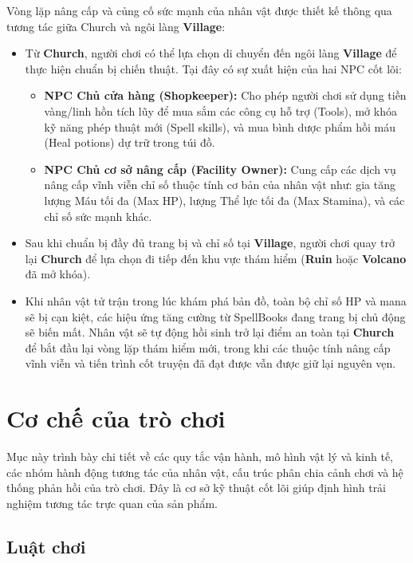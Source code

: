 \documentclass[../DoAn.tex]{subfiles}
\begin{document}
Vòng lặp nâng cấp và củng cố sức mạnh của nhân vật được thiết kế thông qua tương tác giữa Church và ngôi làng \textbf{Village}:
\begin{itemize}
    \item Từ \textbf{Church}, người chơi có thể lựa chọn di chuyển đến ngôi làng \textbf{Village} để thực hiện chuẩn bị chiến thuật. Tại đây có sự xuất hiện của hai NPC cốt lõi:
    \begin{itemize}
        \item \textbf{NPC Chủ cửa hàng (Shopkeeper):} Cho phép người chơi sử dụng tiền vàng/linh hồn tích lũy để mua sắm các công cụ hỗ trợ (Tools), mở khóa kỹ năng phép thuật mới (Spell skills), và mua bình dược phẩm hồi máu (Heal potions) dự trữ trong túi đồ.
        \item \textbf{NPC Chủ cơ sở nâng cấp (Facility Owner):} Cung cấp các dịch vụ nâng cấp vĩnh viễn chỉ số thuộc tính cơ bản của nhân vật như: gia tăng lượng Máu tối đa (Max HP), lượng Thể lực tối đa (Max Stamina), và các chỉ số sức mạnh khác.
    \end{itemize}
    \item Sau khi chuẩn bị đầy đủ trang bị và chỉ số tại \textbf{Village}, người chơi quay trở lại \textbf{Church} để lựa chọn đi tiếp đến khu vực thám hiểm (\textbf{Ruin} hoặc \textbf{Volcano} đã mở khóa).
    \item Khi nhân vật tử trận trong lúc khám phá bản đồ, toàn bộ chỉ số HP và mana sẽ bị cạn kiệt, các hiệu ứng tăng cường từ SpellBooks đang trang bị chủ động sẽ biến mất. Nhân vật sẽ tự động hồi sinh trở lại điểm an toàn tại \textbf{Church} để bắt đầu lại vòng lặp thám hiểm mới, trong khi các thuộc tính nâng cấp vĩnh viễn và tiến trình cốt truyện đã đạt được vẫn được giữ lại nguyên vẹn.
\end{itemize}


\section{Cơ chế của trò chơi}
\label{section:3.3}

Mục này trình bày chi tiết về các quy tắc vận hành, mô hình vật lý và kinh tế, các nhóm hành động tương tác của nhân vật, cấu trúc phân chia cảnh chơi và hệ thống phản hồi của trò chơi. Đây là cơ sở kỹ thuật cốt lõi giúp định hình trải nghiệm tương tác trực quan của sản phẩm.

\subsection{Luật chơi}
\label{subsection:3.3.1}
\end{document}
